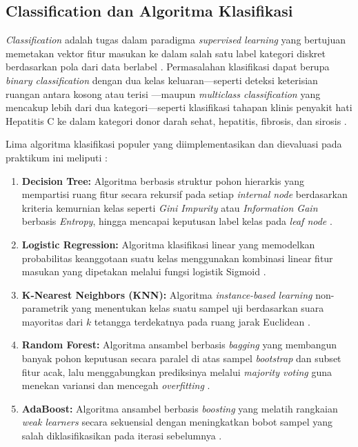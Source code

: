 \documentclass[a4paper,oneside,11pt]{book}
\begin{document}
\subsection{Classification dan Algoritma Klasifikasi}
\par \textit{Classification} adalah tugas dalam paradigma \textit{supervised learning} yang bertujuan memetakan vektor fitur masukan ke dalam salah satu label kategori diskret berdasarkan pola dari data berlabel \cite{retnoningsih2020mengenal, roihan2020pemanfaatan}. Permasalahan klasifikasi dapat berupa \textit{binary classification} dengan dua kelas keluaran---seperti deteksi keterisian ruangan antara kosong atau terisi \cite{candanedo2016accurate}---maupun \textit{multiclass classification} yang mencakup lebih dari dua kategori---seperti klasifikasi tahapan klinis penyakit hati Hepatitis C ke dalam kategori donor darah sehat, hepatitis, fibrosis, dan sirosis \cite{hoffmann2018using, ibm_classification}.
\par Lima algoritma klasifikasi populer yang diimplementasikan dan dievaluasi pada praktikum ini meliputi \cite{scikit_classification, han2022data}:
\begin{enumerate}[label=\arabic*.]
  \item \textbf{Decision Tree:} Algoritma berbasis struktur pohon hierarkis yang mempartisi ruang fitur secara rekursif pada setiap \textit{internal node} berdasarkan kriteria kemurnian kelas seperti \textit{Gini Impurity} atau \textit{Information Gain} berbasis \textit{Entropy}, hingga mencapai keputusan label kelas pada \textit{leaf node} \cite{ibm_decision_tree, han2022data}.
  \item \textbf{Logistic Regression:} Algoritma klasifikasi linear yang memodelkan probabilitas keanggotaan suatu kelas menggunakan kombinasi linear fitur masukan yang dipetakan melalui fungsi logistik Sigmoid \cite{ibm_logistic_regression}.
  \item \textbf{K-Nearest Neighbors (KNN):} Algoritma \textit{instance-based learning} non-parametrik yang menentukan kelas suatu sampel uji berdasarkan suara mayoritas dari $k$ tetangga terdekatnya pada ruang jarak Euclidean \cite{ibm_knn}.
  \item \textbf{Random Forest:} Algoritma ansambel berbasis \textit{bagging} yang membangun banyak pohon keputusan secara paralel di atas sampel \textit{bootstrap} dan subset fitur acak, lalu menggabungkan prediksinya melalui \textit{majority voting} guna menekan variansi dan mencegah \textit{overfitting} \cite{ibm_random_forest}.
  \item \textbf{AdaBoost:} Algoritma ansambel berbasis \textit{boosting} yang melatih rangkaian \textit{weak learners} secara sekuensial dengan meningkatkan bobot sampel yang salah diklasifikasikan pada iterasi sebelumnya \cite{scikit_adaboost}.
\end{enumerate}
\end{document}
